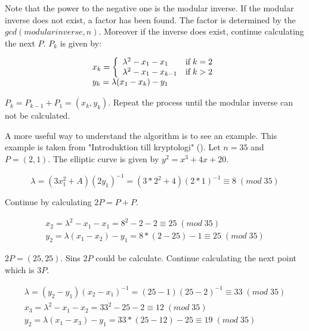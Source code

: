Note that the power to the negative one is the modular inverse. If the modular inverse does not exist, a factor has been found. The factor is determined by the $gcd(modular inverse, n)$. Moreover if the inverse does exist, continue calculating the next $P$. $P_k$ is given by:

\begin{equation*}
    \begin{array}{l}
        x_k =  \left\{\begin{array}{l l}
        \lambda^2 - x_1 - x_1 & \text{if}\; k = 2\\
        \lambda^2 - x_1 - x_{k-1} & \text{if}\; k > 2
        \end{array}\right.\\
        y_k = \lambda(x_1 - x_k) - y_1
    \end{array}
\end{equation*}

$P_k = P_{k-1} + P_1 = (x_k,y_k)$. Repeat the process until the modular inverse can not be calculated.

A more useful way to understand the algorithm is to see an example. This example is taken from "Introduktion till kryptologi" (\cite{Cryptography101}).
Let $n = 35$ and $P = (2,1)$. The elliptic curve is given by $y^2 = x^3 + 4x + 20$.

\begin{equation*}
    \lambda = (3x_1^2 + A)(2y_1)^{-1} = (3*2^2+4)(2*1)^{-1} \equiv 8 \;(mod\;35)
\end{equation*}

Continue by calculating $2P = P + P$.

\begin{equation*}
    \begin{array}{l}
        x_2 = \lambda^2 - x_1 - x_1 = 8^2 - 2 - 2 \equiv 25\;(mod\;35) \\
        y_2 = \lambda(x_1 - x_2) - y_1 = 8*(2-25) - 1 \equiv 25\; (mod\;35)
    \end{array}
\end{equation*}

$2P = (25, 25)$. Sins $2P$ could be calculate. Continue calculating the next point which is $3P$.

\begin{equation*}
    \begin{array}{l}
        \lambda = (y_2 - y_1)(x_2 - x_1)^{-1} = (25-1)(25-2)^{-1} \equiv 33 \; (mod\;35) \\
        x_3 = \lambda^2 - x_1 - x_2 = 33^2 - 25 - 2 \equiv 12 \; (mod\;35)\\
        y_2 = \lambda(x_1 - x_3) - y_1 = 33*(25-12)-25 \equiv 19 \; (mod\;35)
    \end{array}
\end{equation*}

